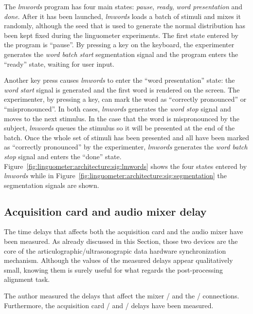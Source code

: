 The \emph{lmwords} program has four main states: \emph{pause}, \emph{ready},
\emph{word presentation} and \emph{done}.
After it has been launched, \emph{lmwords} loads a batch of stimuli and mixes it
randomly, although the seed that is used to generate the normal distribution has
been kept fixed during the linguometer experiments.
The first state entered by the program is ``pause''. By pressing a key on
the  keyboard, the experimenter generates the \emph{word batch start}
segmentation signal and the program enters the ``ready'' state, waiting for
user input.


Another key press causes \emph{lmwords} to enter the ``word presentation''
state: the \emph{word start} signal is generated and the first word is 
rendered on the screen.
The experimenter, by pressing a key, can mark the word as ``correctly
pronounced'' or ``mispronounced''. 
In both cases, \emph{lmwords} generates the \emph{word stop} signal and 
moves to the next stimulus.
In the case that the word is mispronounced by the subject, \emph{lmwords} queues
the stimulus so it will be presented at the end of the batch.
Once the whole set of stimuli has been presented and all
have been marked as ``correctly pronounced'' by the experimenter,
\emph{lmwords} generates the \emph{word batch stop} signal and enters 
the ``done'' state.
Figure~\ref{fig:linguometer:architecture:sig:lmwords} shows the four
states entered by \emph{lmwords} while 
in Figure~\ref{fig:linguometer:architecture:sig:segmentation} the segmentation
signals are shown.
\subsection{Acquisition card and audio mixer delay}
\label{sec:linguometer:technical:delay}
The time delays that affects both the acquisition card and the 
audio mixer have been measured.
As already discussed in this Section, those two devices are the core of the
articulographic/ultrasonograpic data hardware synchronization mechanism.
Although the values of the measured delays appear qualitatively small, knowing 
them is surely useful for what regards the post-processing alignment task.

The author measured the delays that affect the  mixer
/ and the
/ connections.
Furthermore, the   acquisition card
/ and
/ delays have been measured.

